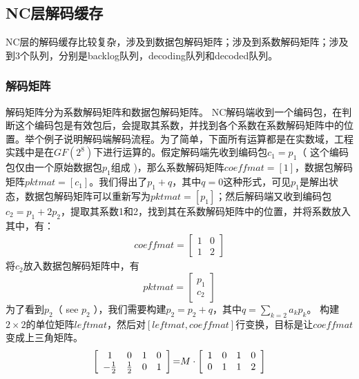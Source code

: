 





\subsection{NC层解码缓存}
NC层的解码缓存比较复杂，涉及到数据包解码矩阵；涉及到系数解码矩阵；涉及到3个队列，分别是backlog队列，decoding队列和decoded队列。
\subsubsection{\textbf{解码矩阵}}
解码矩阵分为系数解码矩阵和数据包解码矩阵。
NC解码端收到一个编码包，在判断这个编码包是有效包后，会提取其系数，并找到各个系数在系数解码矩阵中的位置。举个例子说明解码端解码流程。为了简单，下面所有运算都是在实数域，工程实践中是在$GF\left(2^8\right)$下进行运算的。假定解码端先收到编码包$c_{1}=p_{1}$（ 这个编码包仅由一个原始数据包$p_{1}$组成 )，那么系数解码矩阵$coeffmat=\left[1\right]$，数据包解码矩阵$pktmat=\left[c_1\right]$。我们得出了$p_{1}+q$，其中$q=0$这种形式，可见$p_{1}$是解出状态，数据包解码矩阵可以重新写为$pktmat=\left[p_{1}\right]$；然后解码端又收到编码包$c_{2}=p_{1}+2p_{2}$，提取其系数1和2，找到其在系数解码矩阵中的位置，并将系数放入其中，有：
\begin{eqnarray}\label{eq31}
	coeffmat=\left[ {\begin{array}{*{20}{c}}
	1&0\\
	1&2
	\end{array}} \right]
\end{eqnarray}
将$c_{2}$放入数据包解码矩阵中，有
\begin{equation}\label{eq32}
pktmat = \left[ {\begin{array}{*{20}{c}}
	{{p_1}}\\
	{{c_2}}
	\end{array}} \right]
\end{equation}
为了看到$p_{2}$（ see $p_{2}$ ），我们需要构建$p_{2}=p_{2}+q$，其中$q=\sum\limits_{k = 2} {{a_k}{p_k}} $。
构建$2 \times 2$的单位矩阵$leftmat$，然后对$\left[ {leftmat,coeffmat} \right]$行变换，目标是让$coeffmat$变成上三角矩阵。
\begin{eqnarray}\label{eq33}
\left[ {\begin{array}{*{20}{c}}
	1&0&1&0\\
	{{\rm{ - }}\frac{1}{2}}&{\frac{1}{2}}&0&1
	\end{array}} \right]{\rm{ = }}M \cdot \left[ {\begin{array}{*{20}{c}}
	1&0&1&0\\
	0&1&1&2
	\end{array}} \right]
\end{eqnarray}
